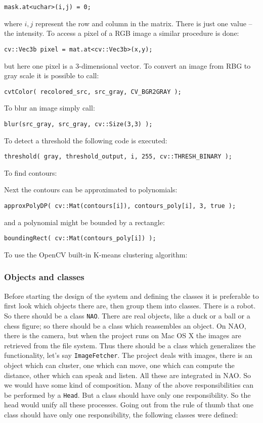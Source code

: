         \verb|mask.at<uchar>(i,j) = 0;| 

        \noindent where \( i, j \) represent the row and column in the matrix. There is just one value -- the intensity. To access a pixel of a RGB image a similar procedure is done:

         \verb|cv::Vec3b pixel = mat.at<cv::Vec3b>(x,y);| 

         \noindent but here one pixel is a 3-dimensional vector. To convert an image from RBG to  gray scale it is possible to call:

        \verb|cvtColor( recolored_src, src_gray, CV_BGR2GRAY );|

        \noindent To blur an image simply call: 

        \verb|blur(src_gray, src_gray, cv::Size(3,3) );| 

        \noindent To detect a threshold the following code is executed:

        \verb|threshold( gray, threshold_output, i, 255, cv::THRESH_BINARY );| 

        \noindent To find contours: 
        
\vspace{5mm}
       Next the contours can be approximated to polynomials:

        \verb|approxPolyDP( cv::Mat(contours[i]), contours_poly[i], 3, true );| 
       
         \noindent and a polynomial might be bounded by a rectangle:

         \verb|boundingRect( cv::Mat(contours_poly[i]) );|

        \noindent To use the OpenCV built-in K-means clustering algorithm:
        

    \subsubsection{Objects and classes}

        Before starting the design of the system and defining the classes it is preferable to first look which objects there are, then group them into classes. There is a robot. So there should be a class \verb|NAO|. There are real objects, like a duck or a ball or a chess figure; so there should be a class which reassembles an object. On NAO, there is the camera, but when the project runs on Mac OS X the images are retrieved from the file system. Thus there should be a class which generalizes the functionality, let's say \verb|ImageFetcher|. The project deals with images, there is an object which can cluster, one which can move, one which can compute the distance, other which can speak and listen. All these are integrated in NAO. So we would have some kind of composition. Many of the above responsibilities can be performed by a \verb|Head|. But a class should have only one responsibility. So the head would unify all these processes. Going out from the rule of thumb that one class should have only one responsibility, the following classes were defined:

